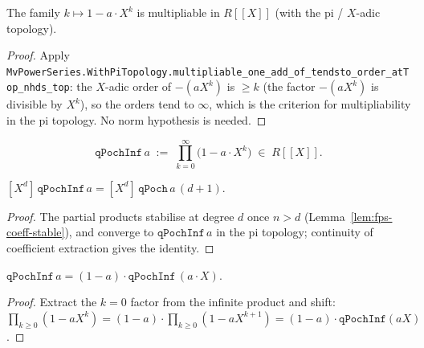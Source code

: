 \begin{theorem}\label{thm:fps-multipliable}\leanok{}
The family $k \mapsto 1 - a\cdot X^k$ is multipliable in $R[\![ X]\!]$
(with the pi / $X$-adic topology).
\end{theorem}

\begin{proof}\leanok
Apply \texttt{MvPowerSeries.WithPiTopology.multipliable\_one\_add\_of\_tendsto\_order\_atTop\_nhds\_top}:
the $X$-adic order of $-(a X^k)$ is $\ge k$ (the factor
$-(a X^k)$ is divisible by $X^k$), so the orders tend to $\infty$,
which is the criterion for multipliability in the pi topology.
No norm hypothesis is needed.
\end{proof}

\begin{definition}\label{def:fps-qPochInf}\leanok{}
\[
  \texttt{qPochInf}\,a
  \;:=\; \prod_{k=0}^{\infty}\bigl(1 - a\cdot X^k\bigr)
  \;\in\; R[\![ X]\!].
\]
\end{definition}

\begin{lemma}\label{lem:fps-coeff-qPochInf}\leanok{}
$[X^d]\,\texttt{qPochInf}\,a = [X^d]\,\texttt{qPoch}\,a\,(d+1)$.
\end{lemma}

\begin{proof}\leanok
The partial products stabilise at degree $d$ once $n > d$
(Lemma~\ref{lem:fps-coeff-stable}), and converge to
$\texttt{qPochInf}\,a$ in the pi topology; continuity of
coefficient extraction gives the identity.
\end{proof}

\begin{lemma}\label{lem:fps-qPochInf-recursion}\leanok{}
$\texttt{qPochInf}\,a = (1-a)\cdot\texttt{qPochInf}\,(a\cdot X)$.
\end{lemma}

\begin{proof}\leanok
Extract the $k=0$ factor from the infinite product and shift:
$\prod_{k\ge 0}(1-a X^k) = (1-a)\cdot\prod_{k\ge 0}(1 - a X^{k+1})
= (1-a)\cdot\texttt{qPochInf}(aX)$.
\end{proof}

